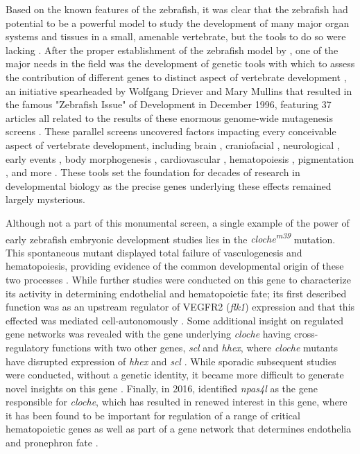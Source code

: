 Based on the known features of the zebrafish, it was clear that the zebrafish had potential to be a powerful model to study the development of many major organ systems and tissues in a small, amenable vertebrate, but the tools to do so were lacking \citep{Bakkers2011}. After the proper establishment of the zebrafish model by \citeauthor{Streisinger1981}, one of the major needs in the field was the development of genetic tools with which to assess the contribution of different genes to distinct aspect of vertebrate development \citep{Driever1994}, an initiative spearheaded by Wolfgang Driever and Mary Mullins that resulted in the famous "Zebrafish Issue" of Development in December 1996, featuring 37 articles all related to the results of these enormous genome-wide mutagenesis screens \citep{Mullins2021, NussleinVolhard2012, Haffter1996, Driever1996, Knapik1996}. These parallel screens uncovered factors impacting every conceivable aspect of vertebrate development, including brain \citep{Schier1996, Heisenberg1996, Jiang1996, Brand1996b, Stemple1996, Odenthal1996a}, craniofacial \citep{Whitfield1996, Malicki1996b, Schilling1996, Piotrowski1996, Neuhauss1996}, neurological \citep{Malicki1996a, FurutaniSeiki1996, Abdelilah1996, Baier1996, Karlstrom1996, Trowe1996}, early events \citep{Kane1996a, Kane1996b}, body morphogenesis \citep{Brand1996a, vanEeden1996a, vanEeden1996b, Hammerschmidt1996a, Mullins1996, Hammerschmidt1996b}, cardiovascular \citep{Stainier1996, Chen1996}, hematopoiesis \citep{Weinstein1996, Ransom1996}, pigmentation \citep{Kelsh1996, Odenthal1996b}, and more \citep{Granato1996, Pack1996}. These tools set the foundation for decades of research in developmental biology as the precise genes underlying these effects remained largely mysterious.

Although not a part of this monumental screen, a single example of the power of early zebrafish embryonic development studies lies in the \textit{cloche\textsuperscript{m39}} mutation. This spontaneous mutant displayed total failure of vasculogenesis and hematopoiesis, providing evidence of the common developmental origin of these two processes \citep{Stainier1995}. While further studies were conducted on this gene to characterize its activity in determining endothelial and hematopoietic fate; its first described function was as an upstream regulator of VEGFR2 (\textit{flk1}) expression and that this effected was mediated cell-autonomously \citep{Liao1997, Parker1999}. Some additional insight on regulated gene networks was revealed with the gene underlying \textit{cloche} having cross-regulatory functions with two other genes, \textit{scl} and \textit{hhex}, where \textit{cloche} mutants have disrupted expression of \textit{hhex} and \textit{scl} \citep{Liao2000}. While sporadic subsequent studies were conducted, without a genetic identity, it became more difficult to generate novel insights on this gene \citep{Qian2005}. Finally, in 2016, \citeauthor{Reischauer2016} identified \textit{npas4l} as the gene responsible for \textit{cloche}, which has resulted in renewed interest in this gene, where it has been found to be important for regulation of a range of critical hematopoietic genes \citep{Marass2019} as well as part of a gene network that determines endothelia and pronephron fate \citep{Mattonet2022}.

